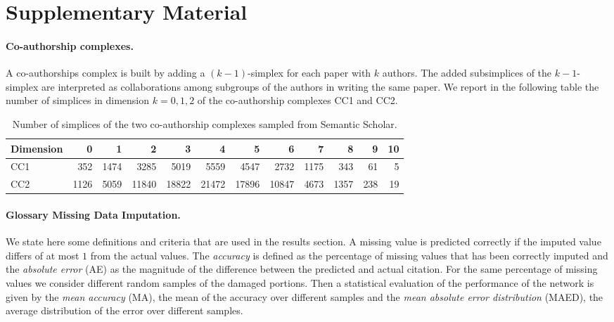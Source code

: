 \section{Supplementary Material}\label{sec:supp_material}

\paragraph{Co-authorship complexes.}
A co-authorships complex is built by adding a $(k-1)$-simplex for each paper with $k$ authors. The added subsimplices of the $k-1$-simplex are interpreted as collaborations among subgroups of the authors in writing the same paper. We report in the following table the number of simplices in dimension $k=0,1,2$ of the co-authorship complexes CC1 and CC2.
\begin{table}[htbp]
  \centering
  \scriptsize{
  \begin{tabular}{lrrrrrrrrrrr}
    \toprule
    Dimension   & 0     & 1  & 2     & 3 & 4     & 5 & 6    & 7 & 8   & 9 & 10\\
    \midrule
    CC1 & 352  & 1474  & 3285  & 5019  & 5559  & 4547  & 2732  & 1175  & 343 & 61 & 5\\
    CC2 & 1126 & 5059 & 11840 & 18822 & 21472 & 17896  & 10847 & 4673 & 1357 & 238 & 19\\
    \bottomrule
  \end{tabular}}
  \vspace{2pt}
  \caption{%
  Number of simplices of the two co-authorship complexes sampled from Semantic Scholar.
  } \label{table:Simplices-coauthor}
\end{table}

\paragraph{Glossary Missing Data Imputation.}
We state here some definitions and criteria that are used in the results section.
A missing value is predicted correctly if the imputed value differs of at most $1$ from the actual values. 
The \emph{accuracy} is defined as the percentage of missing values that has been correctly imputed and the \emph{absolute error} (AE) as the magnitude of the difference between the predicted and actual citation.
For the same percentage of missing values we consider different random samples of the damaged portions. Then a statistical evaluation of the performance of the network is given by the \emph{mean accuracy} (MA), the mean of the accuracy over different samples and the \emph{mean absolute error distribution} (MAED), the average distribution of the error over different samples.

